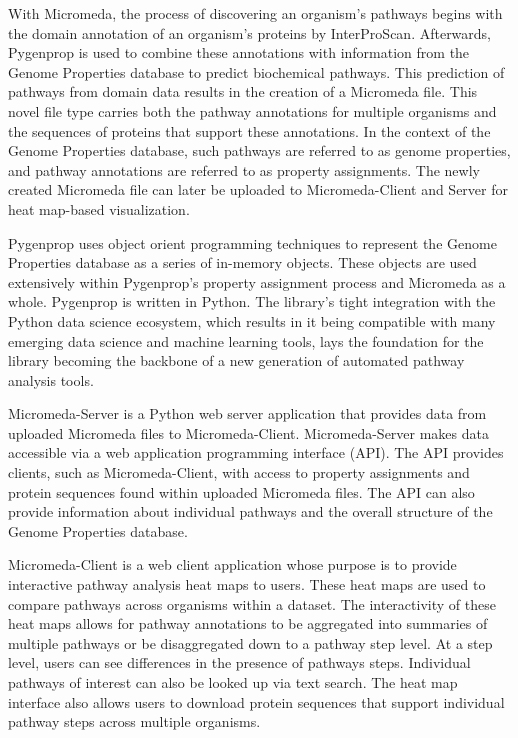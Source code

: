 With Micromeda, the process of discovering an organism's pathways begins with 
the domain annotation of an organism's proteins by InterProScan. Afterwards, 
Pygenprop is used to combine these annotations with information from the Genome 
Properties database to predict biochemical pathways. This prediction of pathways 
from domain data results in the creation of a Micromeda file. This novel file 
type carries both the pathway annotations for multiple organisms and the 
sequences of proteins that support these annotations. In the context of the 
Genome Properties database, such pathways are referred to as genome properties, 
and pathway annotations are referred to as property assignments. The newly 
created Micromeda file can later be uploaded to Micromeda-Client and Server for 
heat map-based visualization.

Pygenprop uses object orient programming techniques to represent the Genome 
Properties database as a series of in-memory objects. These objects are used 
extensively within Pygenprop's property assignment process and Micromeda as a 
whole. Pygenprop is written in Python. The library's tight integration with 
the Python data science ecosystem, which results in it being compatible with 
many emerging data science and machine learning tools, lays the foundation for 
the library becoming the backbone of a new generation of automated pathway 
analysis tools.

Micromeda-Server is a Python web server application that provides data from 
uploaded Micromeda files to Micromeda-Client. Micromeda-Server makes data 
accessible via a web application programming interface (API). The API provides 
clients, such as Micromeda-Client, with access to property assignments and 
protein sequences found within uploaded Micromeda files. The API can also 
provide information about individual pathways and the overall structure of the 
Genome Properties database.

Micromeda-Client is a web client application whose purpose is to provide 
interactive pathway analysis heat maps to users. These heat maps are used to 
compare pathways across organisms within a dataset. The interactivity of these 
heat maps allows for pathway annotations to be aggregated into summaries of 
multiple pathways or be disaggregated down to a pathway step level. At a step 
level, users can see differences in the presence of pathways steps. Individual 
pathways of interest can also be looked up via text search. The heat map 
interface also allows users to download protein sequences that support 
individual pathway steps across multiple organisms.

